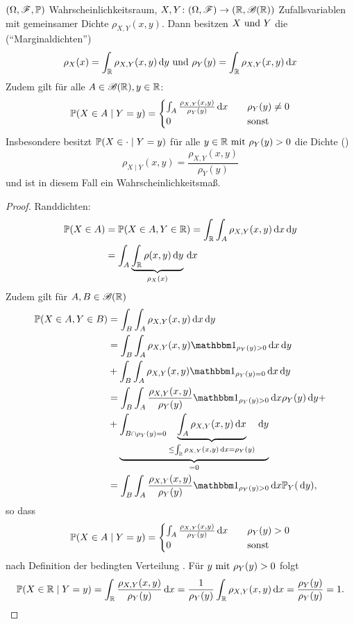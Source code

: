 \begin{proposition}
	$(\O,\F,\P)$ Wahrscheinlichkeitsraum, $X,Y\colon (\O,\F) \to (\R, \borel(\R))$ Zufallsvariablen mit gemeinsamer Dichte $\rho_{X,Y}(x,y)$. Dann besitzen  $X \und Y$ die  (``Marginaldichten'')
	\[
		\rho_X (x) = \int_{\R} \rho_{X,Y}(x,y) \d y \und \rho_Y (y) = \int_{\R} \rho_{X,Y}(x,y) \d x
	\]
	Zudem gilt für alle $A \in \borel(\R), y \in \R$:
	\[
		\P(X \in A \mid Y=y) = \begin{cases}
		\int_A \frac{\rho_{X,Y}(x,y)}{\rho_Y(y)} \d x &\quad \rho_Y(y) \neq 0\\
		0 &\quad \sonst
		\end{cases}
	\]
	Insbesondere besitzt $\P(X \in \cdot \mid Y =y)$ für alle $y \in \R\mit \rho_Y(y) > 0$ die Dichte ()
	\[
		\rho_{X \mid Y} (x,y) = \frac{\rho_{X,Y}(x,y)}{\rho_Y(y)} 
	\]
	und ist in diesem Fall ein Wahrscheinlichkeitsmaß.
\end{proposition}
\begin{proof}
	Randdichten:
	\begin{align*} 
		\P(X \in A) &= \P(X \in A, Y \in \R) = \int_{\R}\int_A \rho_{X,Y}(x,y) \d x \d y \\%
		&= \int_A \underbrace{\int_{\R} \rho(x,y)\d y}_{\rho_X(x)}\d x
	\end{align*}
	Zudem gilt für $A, B \in \borel(\R)$
	\begin{align*}
		\P(X \in A, Y\in B) &= \int_{B} \int_A \rho_{X,Y} (x,y) \d x \d y\\
		&= \int_B \int_A \rho_{X,Y} (x,y) \indi_{\rho_Y (y) >0} \d x \d y\\
		&+\int_B \int_A \rho_{X,Y} (x,y) \indi_{\rho_Y (y) =0} \d x \d y\\
		&= \int_B \int_A \frac{\rho_{X,Y}(x,y)}{\rho_Y(y)} \indi_{\rho_Y (y) >0} \d x \rho_Y(y) \d y + \\
		&+\underbrace{\int_{B \cap \rho_Y(y) =0} \underbrace{\int_A \rho_{X,Y} (x,y) \d x}_{\le\int_{\R} \rho_{X,Y}(x,y) \d x = \rho_Y(y)} \d y}_{=0}\\
		&= \int_B \int_A \frac{\rho_{X,Y}(x,y)}{\rho_Y(y)} \indi_{\rho_Y (y) >0} \d x \P_Y(\d y),
		\end{align*}
		so dass
		\begin{align*}
		\P(X \in A \mid Y = y) = \begin{cases}
		\int_A \frac{\rho_{X,Y}(x,y)}{\rho_Y(y)} \d x & \quad \rho_Y(y) >0\\
		0 &\quad \sonst
		\end{cases}
	\end{align*}
	nach Definition der bedingten Verteilung . Für $y \mit \rho_Y(y) > 0$ folgt
	\begin{align*}
		\P(X \in \R \mid Y = y) = \int_{\R} \frac{\rho_{X,Y}(x,y)}{\rho_Y(y)} \d x = \frac{1}{\rho_Y(y)} \int_{\R} \rho_{X,Y}(x,y) \d x = \frac{\rho_Y(y)}{\rho_Y(y)} = 1.
	\end{align*}
\end{proof}
